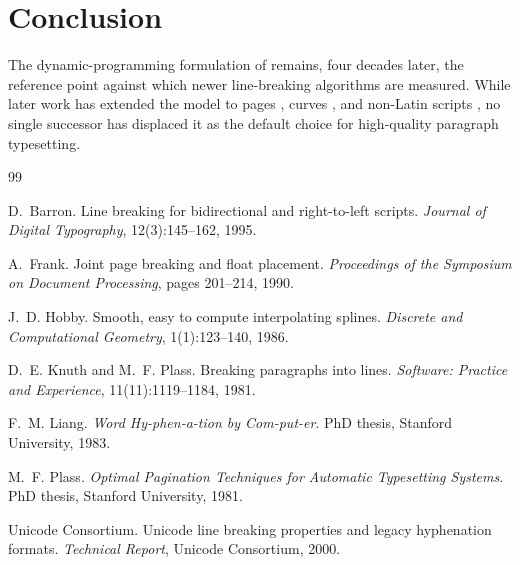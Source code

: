 \documentclass[11pt]{article}
\begin{document}
\section{Conclusion}

The dynamic-programming formulation of \citet{knuthplass1981} remains, four
decades later, the reference point against which newer line-breaking
algorithms are measured. While later work has extended the model to pages
\citep{frank1990}, curves \citep{hobby1986}, and non-Latin scripts
\citep{barron1995,unicode2000}, no single successor has displaced it as the
default choice for high-quality paragraph typesetting.

\begin{thebibliography}{99}

D.~Barron.
\newblock Line breaking for bidirectional and right-to-left scripts.
\newblock \emph{Journal of Digital Typography}, 12(3):145--162, 1995.

A.~Frank.
\newblock Joint page breaking and float placement.
\newblock \emph{Proceedings of the Symposium on Document Processing},
  pages 201--214, 1990.

J.~D. Hobby.
\newblock Smooth, easy to compute interpolating splines.
\newblock \emph{Discrete and Computational Geometry}, 1(1):123--140, 1986.

D.~E. Knuth and M.~F. Plass.
\newblock Breaking paragraphs into lines.
\newblock \emph{Software: Practice and Experience}, 11(11):1119--1184,
  1981.

F.~M. Liang.
\newblock \emph{Word Hy-phen-a-tion by Com-put-er}.
\newblock PhD thesis, Stanford University, 1983.

M.~F. Plass.
\newblock \emph{Optimal Pagination Techniques for Automatic Typesetting
  Systems}.
\newblock PhD thesis, Stanford University, 1981.

Unicode Consortium.
\newblock Unicode line breaking properties and legacy hyphenation formats.
\newblock \emph{Technical Report}, Unicode Consortium, 2000.

\end{thebibliography}
\end{document}
